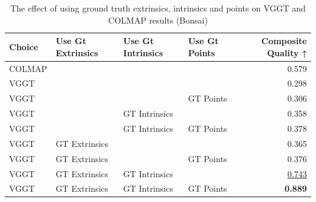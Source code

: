 \begin{table}[H]
\caption{The effect of using ground truth extrinsics, intrinsics and points on VGGT and COLMAP results (Bonsai)}
\label{tab:06_gt_cams_bonsai}
\begin{tabular}{llllr}
\toprule
Choice & Use Gt Extrinsics & Use Gt Intrinsics & Use Gt Points & Composite Quality ↑ \\
\midrule
COLMAP &  &  &  & 0.579 \\
VGGT &  &  &  & 0.298 \\
VGGT &  &  & GT Points & 0.306 \\
VGGT &  & GT Intrinsics &  & 0.358 \\
VGGT &  & GT Intrinsics & GT Points & 0.378 \\
VGGT & GT Extrinsics &  &  & 0.365 \\
VGGT & GT Extrinsics &  & GT Points & 0.376 \\
VGGT & GT Extrinsics & GT Intrinsics &  & \underline{0.743} \\
VGGT & GT Extrinsics & GT Intrinsics & GT Points & \textbf{0.889} \\
\bottomrule
\end{tabular}
\end{table}
